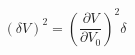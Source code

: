 \begin{equation}
\label{eq:deltaV}
\left(\delta V\right)^2 = \left( \frac{\partial{V}}{\partial{V_0}}\right)^2 \delta 
\end{equation}
